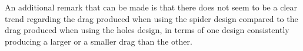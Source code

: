 

An additional remark that can be made is that there does not seem to be a clear trend regarding the drag produced when using the \gls{spider} design compared to the drag produced when using the \gls{holes} design, in terms of one design consistently producing a larger or a smaller drag than the other. 








